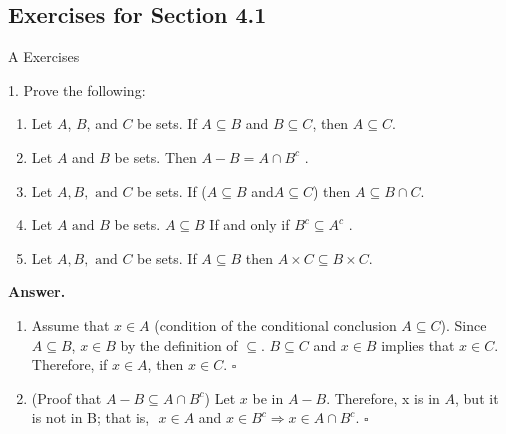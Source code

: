 \documentclass[10pt,]{book}
\theoremstyle{plain}
\theoremstyle{definition}
\theoremstyle{definition}
\theoremstyle{definition}
\begin{document}
\typeout{************************************************}
\typeout{************************************************}
\subsection[Exercises for Section 4.1]{Exercises for Section 4.1}\label{exercises-1}
\hypertarget{exercisegroup-1}{}\typeout{************************************************}
\typeout{************************************************}
A Exercises%
\begin{exercisegroup}
\item[1.]\hypertarget{exercise-4-1-1}{} Prove the following:%
\par
\leavevmode%
\begin{enumerate}[label=\alph*]
\item\hypertarget{li-5}{}Let \(A\), \(B\), and \(C\) be sets. If \(A\subseteq B\) and \(B\subseteq C\), then \(A\subseteq C\).%
\item\hypertarget{li-6}{}Let \(A\) and \(B\) be sets. Then \(A - B= A\cap B^c\) .%
\item\hypertarget{li-7}{}Let \(A,B, \textrm{ and } C\) be sets. If (\(A\subseteq B\) and\(A\subseteq C\)) then \(A\subseteq B\cap C\).%
\item\hypertarget{li-8}{}Let \(A \textrm{ and } B\) be sets. \(A\subseteq B\) If and only if \(B^c\subseteq A^c\) .%
\item\hypertarget{li-9}{}Let \(A,B, \textrm{ and } C\) be sets. If \(A\subseteq B\) then \(A\times C \subseteq B\times C\).%
\end{enumerate}
%
\par\smallskip
\par\smallskip
\noindent\textbf{Answer.}\hypertarget{answer-1}{}\quad
\leavevmode%
\begin{enumerate}[label=\alph*]
\item\hypertarget{li-10}{} Assume that \(x\in A\) (condition of the conditional conclusion \(A \subseteq  C\)). Since \(A \subseteq  B\), \(x\in B\) by the definition of \(\subseteq\). \(B\subseteq C\) and \(x\in B\) implies that \(x\in C\). Therefore, if \(x\in A\), then \(x\in C\). \(\square\) %
\item\hypertarget{li-11}{} (Proof that \(A -B \subseteq A\cap B^c\)) Let \(x\) be in \(A - B\). Therefore, x is in \(A\), but it is not in B; that is,\(\text{  }x \in  A\) and      \(x \in  B^c \Rightarrow x\in A\cap B^c\). \(\square\)%

\end{enumerate}
\end{exercisegroup}
\end{document}
